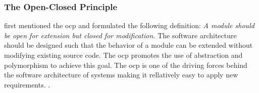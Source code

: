\subsubsection{The Open-Closed Principle} \label{subsubsec_ocp}

\textcite{meyer_object-oriented_1988} first mentioned the \gls{ocp} and formulated the
following definition: \textit{A module should be open for extension but closed for
modification.} The software architecture should be designed such that the behavior of a
module can be extended without modifying existing source code. The \gls{ocp} promotes the
use of abstraction and polymorphism to achieve this goal. The \gls{ocp} is one of the
driving forces behind the software architecture of systems making it rellatively easy to
apply new requirements. \parencite[94]{robert_c_martin_clean_2018}.
